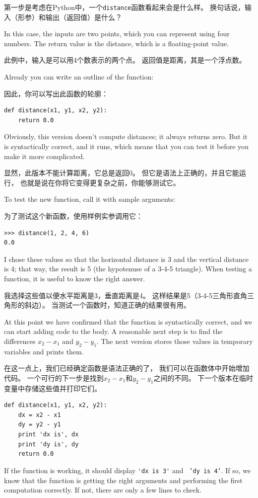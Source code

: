 \documentclass[10pt]{book}
\begin{document}
\begin{CJK}{UTF8}{gbsn}
第一步是考虑在Python中，一个{\tt distance}函数看起来会是什么样。
换句话说，输入（形参）和输出（返回值）是什么？

In this case, the inputs are two points, which you can represent
using four numbers.  The return value is the distance, which is
a floating-point value.

此例中，输入是可以用4个数表示的两个点。
返回值是距离，其是一个浮点数。

Already you can write an outline of the function:

因此，你可以写出此函数的轮廓：

\begin{verbatim}
def distance(x1, y1, x2, y2):
    return 0.0
\end{verbatim}
%
Obviously, this version doesn't compute distances; it always returns
zero.  But it is syntactically correct, and it runs, which means that
you can test it before you make it more complicated.

显然，此版本不能计算距离，它总是返回0。
但它是语法上正确的，并且它能运行，
也就是说在你将它变得更复杂之前，你能够测试它。

To test the new function, call it with sample arguments:

为了测试这个新函数，使用样例实参调用它：

\begin{verbatim}
>>> distance(1, 2, 4, 6)
0.0
\end{verbatim}
%
I chose these values so that the horizontal distance is 3 and the
vertical distance is 4; that way, the result is 5
(the hypotenuse of a 3-4-5 triangle). When testing a function, it is
useful to know the right answer.

我选择这些值以便水平距离是3，垂直距离是4。
这样结果是5（3-4-5三角形直角三角形的斜边）。
当测试一个函数时，知道正确的结果很有用。

At this point we have confirmed that the function is syntactically
correct, and we can start adding code to the body.
A reasonable next step is to find the differences
$x_2 - x_1$ and $y_2 - y_1$.  The next version stores those values in
temporary variables and prints them.

在这一点上，我们已经确定函数是语法正确的了，
我们可以在函数体中开始增加代码。
一个可行的下一步是找到$x_2 - x_1$和$y_2 - y_1$之间的不同。
下一个版本在临时变量中存储这些值并打印它们。

\begin{verbatim}
def distance(x1, y1, x2, y2):
    dx = x2 - x1
    dy = y2 - y1
    print 'dx is', dx
    print 'dy is', dy
    return 0.0
\end{verbatim}
%
If the function is working, it should display \verb"'dx is 3'" and {\tt
'dy is 4'}.  If so, we know that the function is getting the right
arguments and performing the first computation correctly.  If not,
there are only a few lines to check.


\end{CJK}
\end{document}
